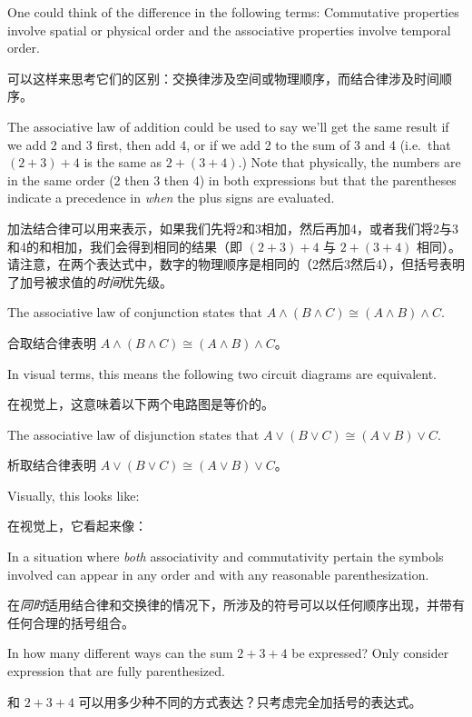 One could think of the difference in the following terms:  
Commutative properties
involve spatial or physical order and the associative properties involve
temporal order.

可以这样来思考它们的区别：交换律涉及空间或物理顺序，而结合律涉及时间顺序。

The associative law of addition could be used to say we'll
get the same result if we add 2 and 3 first, then add 4, or if we add 2 to the 
sum of 3 and 4 (i.e.\ that $(2+3)+4$ is the same as $2+(3+4)$.)  Note that 
physically, the numbers are in the same order (2 then 3 then 4) in both 
expressions but that the parentheses indicate a precedence in {\em when} the
plus signs are evaluated.

加法结合律可以用来表示，如果我们先将2和3相加，然后再加4，或者我们将2与3和4的和相加，我们会得到相同的结果（即 $(2+3)+4$ 与 $2+(3+4)$ 相同）。请注意，在两个表达式中，数字的物理顺序是相同的（2然后3然后4），但括号表明了加号被求值的{\em 时间}优先级。

The associative law of conjunction states that $A \land (B \land C) \cong
(A \land B) \land C$.

合取结合律表明 $A \land (B \land C) \cong (A \land B) \land C$。

In visual terms, this means the following two 
circuit diagrams are equivalent.

在视觉上，这意味着以下两个电路图是等价的。

\begin{center}

\end{center}   
  
The associative law of disjunction states that $A \lor (B \lor C) \cong
(A \lor B) \lor C$.

析取结合律表明 $A \lor (B \lor C) \cong (A \lor B) \lor C$。

Visually, this looks like:

在视觉上，它看起来像：

\begin{center}

\end{center}   
  

\begin{exer}
In a situation where {\em both} associativity and commutativity pertain
the symbols involved can appear in any order and with any reasonable 
parenthesization.

在{\em 同时}适用结合律和交换律的情况下，所涉及的符号可以以任何顺序出现，并带有任何合理的括号组合。

In how many different ways can the sum $2+3+4$ 
be expressed?  Only consider expression that are fully parenthesized.

和 $2+3+4$ 可以用多少种不同的方式表达？只考虑完全加括号的表达式。
\end{exer}
 
